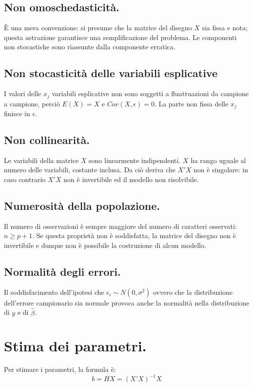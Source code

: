 \documentclass[11pt, twocolumn]{article}
\begin{document}
\subsection*{Non omoschedasticità.}
È una mera convenzione: si presume che la matrice del disegno $X$ sia fissa e nota; questa astrazione garantisce una semplificazione del problema.
Le componenti non stocastiche sono riassunte dalla componente erratica.

\subsection*{Non stocasticità delle variabili esplicative}
I valori delle $x_j$ variabili esplicative non sono soggetti a fluattuazioni da campione a campione, perciò $E(X) = X$ e $Cov(X,\epsilon) = 0$. La parte non fissa delle $x_j$ finisce in $\epsilon$.

\subsection*{Non collinearità.}
Le variabili della matrice $X$ sono linearmente indipendenti. $X$ ha rango uguale al numero delle variabili, costante inclusa. Da ciò deriva che $X'X$ non è singolare: in caso contrario $X'X$ non è invertibile ed il modello non risolvibile.

\subsection*{Numerosità della popolazione.}
Il numero di osservazioni è sempre maggiore del numero di caratteri osservati: $n \geq p + 1$.
Se questa proprietà non è soddisfatta, la matrice del disegno non è invertibile e dunque non è possibile la costruzione di alcun modello.

\subsection*{Normalità degli errori.}
Il soddisfacimento dell'ipotesi che $\epsilon_i \sim N(0,\sigma^2)$ ovvero che la distribuzione dell’errore campionario sia normale provoca anche la normalità nella distribuzione di $y$ e di $\hat{\beta}$.

\section{Stima dei parametri.}
Per stimare i parametri, la formula è:
\begin{equation*}
  b = HX = (X'X)^{-1}X
\end{equation*}
\end{document}
